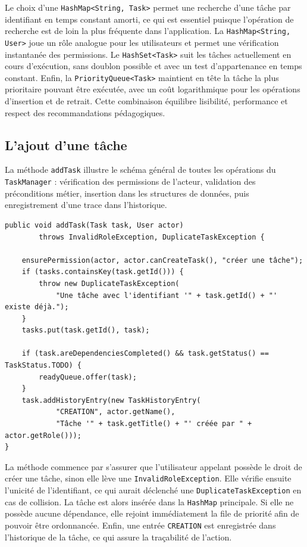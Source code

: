 \documentclass[11pt]{article}
\begin{document}
Le choix d'une \texttt{HashMap<String, Task>} permet une recherche d'une
tâche par identifiant en temps constant amorti, ce qui est essentiel
puisque l'opération de recherche est de loin la plus fréquente dans
l'application. La \texttt{HashMap<String, User>} joue un rôle analogue
pour les utilisateurs et permet une vérification instantanée des
permissions. Le \texttt{HashSet<Task>} suit les tâches actuellement en
cours d'exécution, sans doublon possible et avec un test d'appartenance
en temps constant. Enfin, la \texttt{PriorityQueue<Task>} maintient en
tête la tâche la plus prioritaire pouvant être exécutée, avec un coût
logarithmique pour les opérations d'insertion et de retrait. Cette
combinaison équilibre lisibilité, performance et respect des
recommandations pédagogiques.

\subsection{L'ajout d'une tâche}
La méthode \texttt{addTask} illustre le schéma général de toutes les
opérations du \texttt{TaskManager} : vérification des permissions de
l'acteur, validation des préconditions métier, insertion dans les
structures de données, puis enregistrement d'une trace dans l'historique.

\begin{lstlisting}[caption={Ajout d'une tâche}]
public void addTask(Task task, User actor)
        throws InvalidRoleException, DuplicateTaskException {

    ensurePermission(actor, actor.canCreateTask(), "créer une tâche");
    if (tasks.containsKey(task.getId())) {
        throw new DuplicateTaskException(
            "Une tâche avec l'identifiant '" + task.getId() + "' existe déjà.");
    }
    tasks.put(task.getId(), task);

    if (task.areDependenciesCompleted() && task.getStatus() == TaskStatus.TODO) {
        readyQueue.offer(task);
    }
    task.addHistoryEntry(new TaskHistoryEntry(
            "CREATION", actor.getName(),
            "Tâche '" + task.getTitle() + "' créée par " + actor.getRole()));
}
\end{lstlisting}

La méthode commence par s'assurer que l'utilisateur appelant possède le
droit de créer une tâche, sinon elle lève une
\texttt{InvalidRoleException}. Elle vérifie ensuite l'unicité de
l'identifiant, ce qui aurait déclenché une \texttt{DuplicateTaskException}
en cas de collision. La tâche est alors insérée dans la \texttt{HashMap}
principale. Si elle ne possède aucune dépendance, elle rejoint
immédiatement la file de priorité afin de pouvoir être ordonnancée.
Enfin, une entrée \texttt{CREATION} est enregistrée dans l'historique de
la tâche, ce qui assure la traçabilité de l'action.
\end{document}
